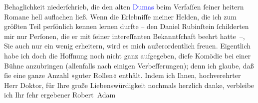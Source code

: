                     Behaglichkeit niederſchrieb, die den alten \textcolor{blue}{Dumas}{}\ledrightnote{\textcolor{blue}{Alexandre père Dumas}} beim Verfaſſen ſeiner heitern Romane hell auflachen ließ. Wenn
                    die Erlebniſſe meiner Helden, die ich zum größten Teil perſönlich kennen lernen
                    durfte – den Daniel Rubinſtein ſchilderten mir nur Perſonen, die er mit ſeiner
                    intereſſanten Bekanntſchaft beehrt hatte –, Sie auch nur ein wenig erheitern,
                    wird es mich außerordentlich freuen. Eigentlich habe ich doch die Hoffnung noch
                    nicht ganz aufgegeben, dieſe Komödie bei einer Bühne anzubringen (allenfalls
                    nach einigen Verbeſſerungen); denn ich glaube, daß ſie eine ganze Anzahl »guter
                    Rollen« enthält.\pend
           \pstart
           Indem ich Ihnen, hochverehrter Herr Doktor, für Ihre große Liebenswürdigkeit
                    nochmals herzlich danke, verbleibe ich Ihr ſehr ergebener\pend
           \pstart \spacefill\mbox{Robert Adam}\pend{}\endnumbering{}  
      